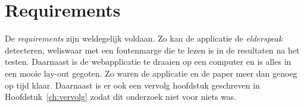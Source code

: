 \section{Requirements}
De \textit{requirements} zijn weldegelijk voldaan. Zo kan de applicatie de \textit{elderspeak} detecteren, weliswaar met een foutenmarge die te lezen is in de resultaten na het testen.
Daarnaast is de webapplicatie te draaien op een computer en is alles in een mooie lay-out gegoten.
Zo waren de applicatie en de paper meer dan genoeg op tijd klaar. Daarnaast is er ook een vervolg hoofdstuk geschreven in Hoofdstuk~\ref{ch:vervolg} zodat dit onderzoek niet voor niets was.
